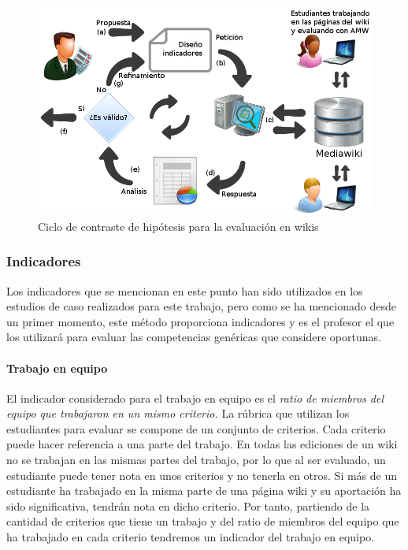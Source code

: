 \begin{figure}
  \begin{center}
    \includegraphics[scale=0.45]{AmwDiagram2.png}
  \end{center}
  \caption{Ciclo de contraste de hipótesis para la evaluación en wikis}
  \label{fig:AmwDiagram2}
\end{figure}

\subsubsection{Indicadores}

Los indicadores que se mencionan en este punto han sido utilizados en los estudios de caso realizados para este trabajo, pero como se ha mencionado desde un primer momento, este método proporciona indicadores y es el profesor el que los utilizará para evaluar las competencias genéricas que considere oportunas.

\paragraph*{Trabajo en equipo}
El indicador considerado para el trabajo en equipo es el \emph{ratio de miembros del equipo que trabajaron en un mismo criterio.} La rúbrica que utilizan los estudiantes para evaluar se compone de un conjunto de criterios. Cada criterio puede hacer referencia a una parte del trabajo. En todas las ediciones de un wiki no se trabajan en las mismas partes del trabajo, por lo que al ser evaluado, un estudiante puede tener nota en unos criterios y no tenerla en otros. Si más de un estudiante ha trabajado en la misma parte de una página wiki y su aportación ha sido significativa, tendrán nota en dicho criterio. Por tanto, partiendo de la cantidad de criterios que tiene un trabajo y del ratio de miembros del equipo que ha trabajado en cada criterio tendremos un indicador del trabajo en equipo.

